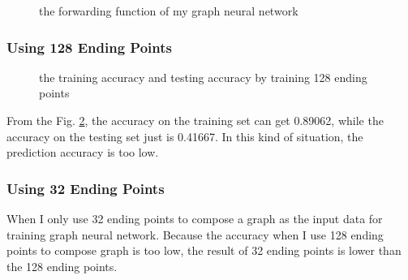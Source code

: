 \begin{figure}[ht!]
    \centering
    \caption{the forwarding function of my graph neural network}
    \label{network}
\end{figure}


\subsubsection{Using 128 Ending Points}
\begin{figure}[ht!]
    \centering
    \caption{the training accuracy and testing accuracy by training 128 ending points}
    \label{ending-128}
\end{figure}

From the Fig. \ref{ending-128}, the accuracy on the training set can get 0.89062, while the accuracy on the testing set just is 0.41667. In this kind of situation, the prediction accuracy is too low.

\subsubsection{Using 32 Ending Points}
When I only use 32 ending points to compose a graph as the input data for training graph neural network. Because the accuracy when I use 128 ending points to compose graph is too low, the result of 32 ending points is lower than the 128 ending points.


